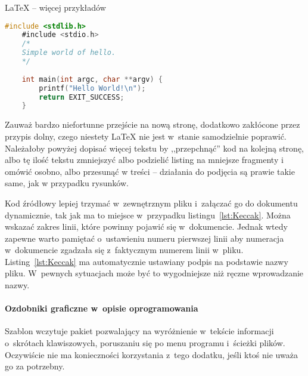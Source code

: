 \begin{easyappendix}{\LaTeX{} -- więcej przykładów}
\begin{lstlisting}[language=C,
	backgroundcolor=\color{bezowy!25!white},
	caption={Prosty kod w~języku C},
	label={lst:helloC}]
	#include <stdlib.h>
	#include <stdio.h>
	/* 
	Simple world of hello.
	*/
	
	int main(int argc, char **argv) {
		printf("Hello World!\n");
		return EXIT_SUCCESS;
	}
\end{lstlisting}

Zauważ bardzo niefortunne przejście na nową stronę, dodatkowo zakłócone przez przypis dolny, czego niestety \LaTeX{} nie jest w~stanie samodzielnie poprawić. Należałoby powyżej dopisać więcej tekstu by ,,przepchnąć'' kod na kolejną stronę, albo tę ilość tekstu zmniejszyć albo podzielić listing na mniejsze fragmenty i omówić osobno, albo przesunąć w treści -- działania do podjęcia są prawie takie same, jak w przypadku rysunków.

Kod źródłowy lepiej trzymać w~zewnętrznym pliku i~załączać go do dokumentu dynamicznie, tak jak ma to miejsce w~przypadku listingu~\ref{lst:Keccak}. Można wskazać zakres linii, które powinny pojawić się w~dokumencie. Jednak wtedy zapewne warto pamiętać o~ustawieniu numeru pierwszej linii aby numeracja w~dokumencie zgadzała się z~faktycznym numerem linii w~pliku. Listing~\ref{lst:Keccak} ma automatycznie ustawiany podpis na podstawie nazwy pliku. W~pewnych sytuacjach może być to wygodniejsze niż ręczne wprowadzanie nazwy.



\paragraph{Ozdobniki graficzne w~opisie oprogramowania}
Szablon wczytuje pakiet pozwalający na wyróżnienie w~tekście informacji o~skrótach klawiszowych, poruszaniu się po menu programu i~ścieżki plików. Oczywiście nie ma konieczności korzystania z~tego dodatku, jeśli ktoś nie uważa go za potrzebny.


\end{easyappendix}
